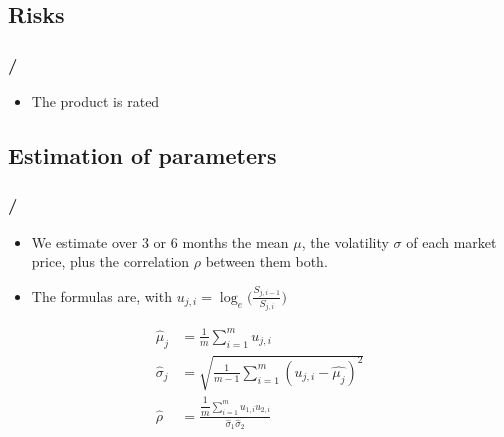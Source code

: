 \begin{frame}
\begin{frame}
\subsection{Risks}
\begin{frame}
\frametitle{\insertsection / \insertsubsection}
\begin{itemize}
	\item The product is rated 
\end{itemize}

\centering
\end{frame}

\subsection{Estimation of parameters}
\begin{frame}
\frametitle{\insertsection / \insertsubsection}
\begin{itemize}
	\item We estimate over 3 or 6 months the mean $\mu$, the volatility $\sigma$ of each market price, plus the correlation $\rho$ between them both.
	\item The formulas are, with $u_{j,i} = \log_e\bigl(\frac{S_{j,i-1}}{S_{j,i}}\bigr)$
\end{itemize}
\begin{align*}
	\hat{\mu}_j    &= \frac{1}{m} \sum_{i=1}^m u_{j,i} \\
	\hat{\sigma}_j &= \sqrt{\frac{1}{m-1} \sum_{i=1}^m (u_{j,i}-\hat{\mu_j})^2} \\
	\hat{\rho}   \;&= \frac{\dfrac{1}{m}\sum_{i=1}^m u_{1,i}u_{2,i}}{\hat{\sigma}_1 \hat{\sigma}_2}
\end{align*}
\end{frame}


\end{frame}
\end{frame}
